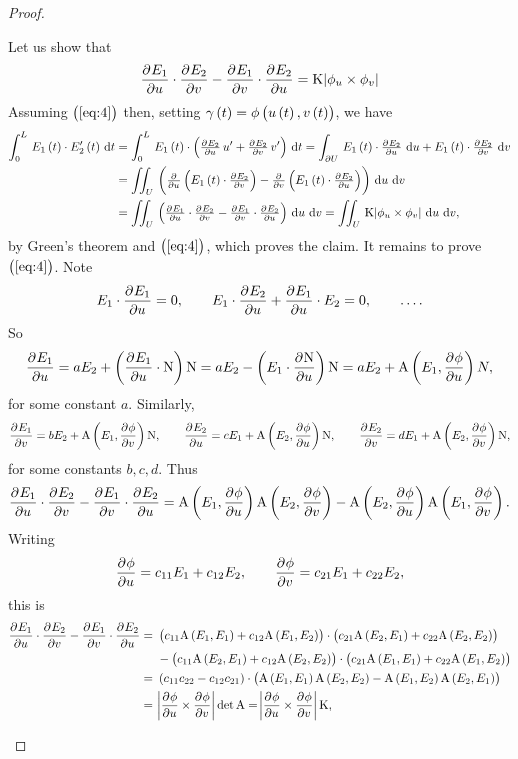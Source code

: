 \begin{proof}
\begin{itemize}
Let us show that
\begin{equation}
\label{eq:4}
\dpd{E_1}{u} \cdot \dpd{E_2}{v} - \dpd{E_1}{v} \cdot \dpd{E_2}{u} = \K\abs{\phi_u \times \phi_v}
\end{equation}
Assuming $ \br{\ref{eq:4}} $ then, setting $ \gamma\br{t} = \phi\br{u\br{t}, v\br{t}} $, we have
\begin{align*}
\intd{0}{L}{E_1\br{t} \cdot E_2'\br{t}}{t}
& = \intd{0}{L}{E_1\br{t} \cdot \br{\tpd{E_2}{u}u' + \tpd{E_2}{v}v'}}{t}
= \int_{\partial U} \, E_1\br{t} \cdot \tpd{E_2}{u} \, \d u + E_1\br{t} \cdot \tpd{E_2}{v} \, \d v \\
& = \iintd{U}{\br{\tpd{}{u}\br{E_1\br{t} \cdot \tpd{E_2}{v}} - \tpd{}{v}\br{E_1\br{t} \cdot \tpd{E_2}{u}}}}{u}{v} \\
& = \iintd{U}{\br{\tpd{E_1}{u} \cdot \tpd{E_2}{v} - \tpd{E_1}{v} \cdot \tpd{E_2}{u}}}{u}{v} = \iintd{U}{\K\abs{\phi_u \times \phi_v}}{u}{v},
\end{align*}
by Green's theorem and $ \br{\ref{eq:4}} $, which proves the claim. It remains to prove $ \br{\ref{eq:4}} $. Note
$$ E_1 \cdot \dpd{E_1}{u} = 0, \qquad E_1 \cdot \dpd{E_2}{u} + \dpd{E_1}{u} \cdot E_2 = 0, \qquad \dots. $$
So
$$ \dpd{E_1}{u} = aE_2 + \br{\dpd{E_1}{u} \cdot \N}\N = aE_2 - \br{E_1 \cdot \dpd{\N}{u}}\N = aE_2 + \A\br{E_1, \dpd{\phi}{u}}N, $$
for some constant $ a $. Similarly,
$$ \dpd{E_1}{v} = bE_2 + \A\br{E_1, \dpd{\phi}{v}}\N, \qquad \dpd{E_2}{u} = cE_1 + \A\br{E_2, \dpd{\phi}{u}}\N, \qquad \dpd{E_2}{v} = dE_1 + \A\br{E_2, \dpd{\phi}{v}}\N, $$
for some constants $ b, c, d $. Thus
$$ \dpd{E_1}{u} \cdot \dpd{E_2}{v} - \dpd{E_1}{v} \cdot \dpd{E_2}{u} = \A\br{E_1, \dpd{\phi}{u}}\A\br{E_2, \dpd{\phi}{v}} - \A\br{E_2, \dpd{\phi}{u}}\A\br{E_1, \dpd{\phi}{v}}. $$
Writing
$$ \dpd{\phi}{u} = c_{11}E_1 + c_{12}E_2, \qquad \dpd{\phi}{v} = c_{21}E_1 + c_{22}E_2, $$
this is
\begin{align*}
\dpd{E_1}{u} \cdot \dpd{E_2}{v} - \dpd{E_1}{v} \cdot \dpd{E_2}{u}
= \ & \br{c_{11}\A\br{E_1, E_1} + c_{12}\A\br{E_1, E_2}} \cdot \br{c_{21}\A\br{E_2, E_1} + c_{22}\A\br{E_2, E_2}} \\
& - \br{c_{11}\A\br{E_2, E_1} + c_{12}\A\br{E_2, E_2}} \cdot \br{c_{21}\A\br{E_1, E_1} + c_{22}\A\br{E_1, E_2}} \\
= \ & \br{c_{11}c_{22} - c_{12}c_{21}} \cdot \br{\A\br{E_1, E_1}\A\br{E_2, E_2} - \A\br{E_1, E_2}\A\br{E_2, E_1}} \\
= \ & \abs{\dpd{\phi}{u} \times \dpd{\phi}{v}}\det \A
= \abs{\dpd{\phi}{u} \times \dpd{\phi}{v}}\K,
\end{align*}

\end{itemize}
\end{proof}
